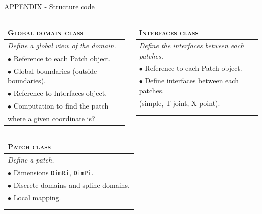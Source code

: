 \documentclass[
	english,%
	logo=false,%
	eurofusion=false, %
	titlegraphic=true, %
	]{ippbeamer}
\begin{document}
\begin{frame}{APPENDIX - Structure code}
\vspace*{0.5cm}
\centering
\scriptsize

\begin{columns}
\begin{column}{0.5\textwidth}
\begin{tabular}{|l|}
	\hline
	\textbf{\textsc{Global domain class}} \\
	\hline
	\textit{Define a global view of the domain.} \\
	$\bullet$ Reference to each Patch object.\\
	$\bullet$ Global boundaries (outside boundaries).\\
	$\bullet$ Reference to Interfaces object.\\
	$\bullet$ Computation to find the patch \\ where a given coordinate is? \\
	\hline
\end{tabular}
\end{column}
\begin{column}{0.5\textwidth}
\begin{tabular}{|l|}
	\hline
	\textbf{\textsc{Interfaces class}}\\
	\hline
	\textit{Define the interfaces between each patches.} \\
	$\bullet$ Reference to each Patch object.\\
	$\bullet$ Define interfaces between each patches.\\ 
	(simple, T-joint, X-point). \\
	\\
	\\
	\hline
\end{tabular}
\end{column}
\end{columns}

\vspace*{0.5cm}


\begin{tabular}{|l|}
	\hline
	\textbf{\textsc{Patch class}} \\
	\hline
	\textit{Define a patch.}\\ 
	$\bullet$ Dimensions \texttt{DimRi}, \texttt{DimPi}. \\
	$\bullet$ Discrete domains and spline domains. \\
	$\bullet$ Local mapping. \\
	\\
	\\
	\hline
\end{tabular}


\end{frame}
\end{document}
